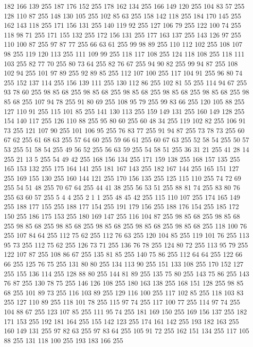182 166 139 255 187 176 152 255 178 162 134 255 166 149 120 255 104 83 57 255 128 110 87 255 148 130 105 255 102 85 63 255 158 142 118 255 184 170 145 255 162 143 118 255 171 156 131 255 140 119 92 255 127 106 79 255 122 100 74 255 118 98 71 255 171 155 132 255 172 156 131 255 177 163 137 255 143 126 97 255 110 100 87 255 97 87 77 255 66 63 61 255 99 98 89 255 110 112 102 255 108 107 98 255 119 120 113 255 111 109 99 255 118 117 108 255 124 118 108 255 118 111 103 255 82 77 70 255 80 73 64 255 82 76 67 255 94 90 82 255 99 94 87 255 108 102 94 255 101 97 89 255 92 89 85 255 112 107 100 255 117 104 91 255 96 80 74 255 152 137 114 255 156 139 111 255 130 112 86 255 102 81 55 255 114 94 67 255 93 78 60 255 98 85 68 255 98 85 68 255 98 85 68 255 98 85 68 255 98 85 68 255 98 85 68 255 107 94 78 255 91 80 69 255 108 95 79 255 99 83 66 255 120 105 88 255 127 110 91 255 115 101 85 255 141 130 113 255 159 149 131 255 160 149 128 255
154 140 117 255 126 110 88 255 95 80 60 255 60 48 34 255 119 102 82 255 106 91 73 255 121 107 90 255 101 106 95 255 76 83 77 255 91 94 87 255 73 78 73 255 60 67 62 255 61 68 63 255 57 64 60 255 59 66 61 255 60 67 63 255 52 58 54 255 50 57 53 255 51 58 54 255 49 56 52 255 56 63 59 255 54 58 51 255 36 31 21 255 41 28 14 255 21 13 5 255 54 49 42 255 168 156 134 255 171 159 138 255 168 157 135 255 165 153 132 255 175 164 141 255 181 167 143 255 182 167 144 255 165 151 127 255 169 155 130 255 160 144 121 255 170 156 135 255 125 115 110 255 74 72 69 255 54 51 48 255 70 67 64 255 44 41 38 255 56 53 51 255 88 81 74 255 83 80 76 255 63 60 57 255 5 4 4 255 2 1 1 255 48 45 42 255 115 110 107 255 174 165 149 255 188 177 155 255 188 177 154 255 191 179 156 255 188 176 154 255 185 172 150 255 186 175 153 255 180 169 147 255 116 104 87 255 98 85 68 255 98 85 68 255 98 85 68 255 98 85 68 255 98 85 68 255
98 85 68 255 98 85 68 255 118 100 76 255 107 84 64 255 112 75 62 255 112 76 63 255 120 104 85 255 119 101 76 255 113 95 73 255 112 75 62 255 126 73 71 255 136 76 78 255 124 80 72 255 113 95 79 255 122 107 87 255 108 86 67 255 135 81 85 255 140 75 86 255 112 64 64 255 122 66 66 255 125 76 75 255 131 80 80 255 134 113 90 255 151 133 108 255 170 152 127 255 155 136 114 255 128 88 80 255 144 81 89 255 135 75 80 255 143 75 86 255 143 76 87 255 130 78 75 255 146 126 108 255 180 163 138 255 168 151 128 255 98 85 68 255 101 89 73 255 116 103 89 255 129 116 100 255 117 102 85 255 118 103 83 255 127 110 89 255 118 101 78 255 115 97 74 255 117 100 77 255 114 97 74 255 104 88 67 255 123 107 85 255 111 95 74 255 181 169 150 255 169 156 137 255 182 171 153 255 192 181 164 255 155 142 123 255 174 161 142 255 193 182 163 255 160 149 131 255 97 82 63 255 97 83 64 255 105 91 72 255 162 151 134 255 117 105 88 255 131 118 100 255 193 183 166 255
